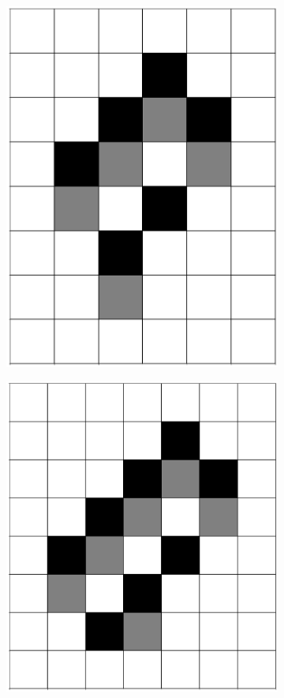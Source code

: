 \documentclass[12pt]{article}
\numberwithin{figure}{section} %
\begin{document}
\begin{figure}[H]
\begin{subfigure}{0.16\textwidth}
     		\includegraphics[width=\linewidth]{Section4/21.1}
     		\subcaption{}
   	\end{subfigure}
        \begin{subfigure}{0.16\textwidth}
     		\centering
     		\includegraphics[width=\linewidth]{Section4/21.2}

\end{subfigure}
\end{figure}
\end{document}
